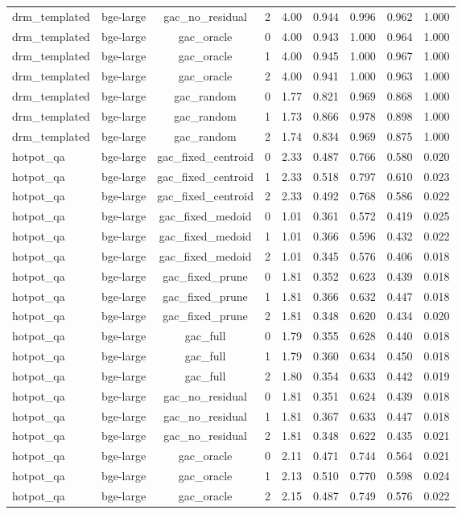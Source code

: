 \begin{longtable}{lcccccccc}
drm\_templated & bge-large & gac\_no\_residual & 2 & 4.00 & 0.944 & 0.996 & 0.962 & 1.000 \\
drm\_templated & bge-large & gac\_oracle & 0 & 4.00 & 0.943 & 1.000 & 0.964 & 1.000 \\
drm\_templated & bge-large & gac\_oracle & 1 & 4.00 & 0.945 & 1.000 & 0.967 & 1.000 \\
drm\_templated & bge-large & gac\_oracle & 2 & 4.00 & 0.941 & 1.000 & 0.963 & 1.000 \\
drm\_templated & bge-large & gac\_random & 0 & 1.77 & 0.821 & 0.969 & 0.868 & 1.000 \\
drm\_templated & bge-large & gac\_random & 1 & 1.73 & 0.866 & 0.978 & 0.898 & 1.000 \\
drm\_templated & bge-large & gac\_random & 2 & 1.74 & 0.834 & 0.969 & 0.875 & 1.000 \\
hotpot\_qa & bge-large & gac\_fixed\_centroid & 0 & 2.33 & 0.487 & 0.766 & 0.580 & 0.020 \\
hotpot\_qa & bge-large & gac\_fixed\_centroid & 1 & 2.33 & 0.518 & 0.797 & 0.610 & 0.023 \\
hotpot\_qa & bge-large & gac\_fixed\_centroid & 2 & 2.33 & 0.492 & 0.768 & 0.586 & 0.022 \\
hotpot\_qa & bge-large & gac\_fixed\_medoid & 0 & 1.01 & 0.361 & 0.572 & 0.419 & 0.025 \\
hotpot\_qa & bge-large & gac\_fixed\_medoid & 1 & 1.01 & 0.366 & 0.596 & 0.432 & 0.022 \\
hotpot\_qa & bge-large & gac\_fixed\_medoid & 2 & 1.01 & 0.345 & 0.576 & 0.406 & 0.018 \\
hotpot\_qa & bge-large & gac\_fixed\_prune & 0 & 1.81 & 0.352 & 0.623 & 0.439 & 0.018 \\
hotpot\_qa & bge-large & gac\_fixed\_prune & 1 & 1.81 & 0.366 & 0.632 & 0.447 & 0.018 \\
hotpot\_qa & bge-large & gac\_fixed\_prune & 2 & 1.81 & 0.348 & 0.620 & 0.434 & 0.020 \\
hotpot\_qa & bge-large & gac\_full & 0 & 1.79 & 0.355 & 0.628 & 0.440 & 0.018 \\
hotpot\_qa & bge-large & gac\_full & 1 & 1.79 & 0.360 & 0.634 & 0.450 & 0.018 \\
hotpot\_qa & bge-large & gac\_full & 2 & 1.80 & 0.354 & 0.633 & 0.442 & 0.019 \\
hotpot\_qa & bge-large & gac\_no\_residual & 0 & 1.81 & 0.351 & 0.624 & 0.439 & 0.018 \\
hotpot\_qa & bge-large & gac\_no\_residual & 1 & 1.81 & 0.367 & 0.633 & 0.447 & 0.018 \\
hotpot\_qa & bge-large & gac\_no\_residual & 2 & 1.81 & 0.348 & 0.622 & 0.435 & 0.021 \\
hotpot\_qa & bge-large & gac\_oracle & 0 & 2.11 & 0.471 & 0.744 & 0.564 & 0.021 \\
hotpot\_qa & bge-large & gac\_oracle & 1 & 2.13 & 0.510 & 0.770 & 0.598 & 0.024 \\
hotpot\_qa & bge-large & gac\_oracle & 2 & 2.15 & 0.487 & 0.749 & 0.576 & 0.022 \\
\end{longtable}

